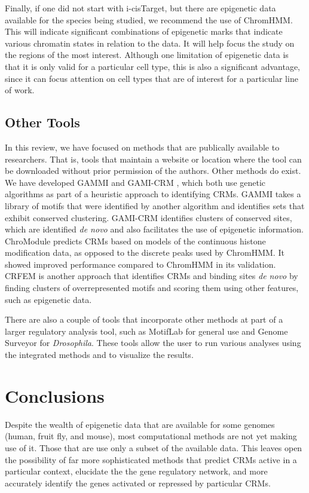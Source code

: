 \documentclass{frontiersENG} %
\begin{document}
Finally, if one did not start with i-cisTarget, but there are
epigenetic data available for the species being studied, we recommend
the use of ChromHMM. This will indicate significant combinations of
epigenetic marks that indicate various chromatin states in relation to
the data. It will help focus the study on the regions of the most
interest. Although one limitation of epigenetic data is that it is
only valid for a particular cell type, this is also a significant
advantage, since it can focus attention on cell types that are of
interest for a particular line of work.

\subsection{Other Tools}
In this review, we have focused on methods that are publically
available to researchers. That is, tools that maintain a website or
location where the tool can be downloaded without prior permission of
the authors. Other methods do exist. We have developed GAMMI
\cite{Gagne2012} and GAMI-CRM \cite{Thompson2014}, which both use
genetic algorithms as part of a heuristic approach to identifying
CRMs. GAMMI takes a library of motifs that were identified by another
algorithm and identifies sets that exhibit conserved clustering.
GAMI-CRM identifies clusters of conserved sites, which are identified
\textit{de novo} and also facilitates the use of epigenetic
information. ChroModule \cite{Won2013} predicts CRMs based on models
of the continuous histone modification data, as opposed to the
discrete peaks used by ChromHMM. It showed improved performance
compared to ChromHMM in its validation. CRFEM \cite{Gan2014} is
another approach that identifies CRMs and binding sites \textit{de
  novo} by finding clusters of overrepresented motifs and scoring them
using other features, such as epigenetic data.

There are also a couple of tools that incorporate other methods at
part of a larger regulatory analysis tool, such as MotifLab
\cite{Klepper2013} for general use and \cite{Kazemian2011} Genome
Surveyor for \textit{Drosophila}. These tools allow the user to run
various analyses using the integrated methods and to visualize the
results.

\section{Conclusions}
Despite the wealth of epigenetic data that are available for some
genomes (human, fruit fly, and mouse), most computational methods are
not yet making use of it. Those that are use only a subset of the
available data. This leaves open the possibility of far more
sophisticated methods that predict CRMs active in a particular
context, elucidate the the gene regulatory network, and more
accurately identify the genes activated or repressed by particular
CRMs.
\end{document}
